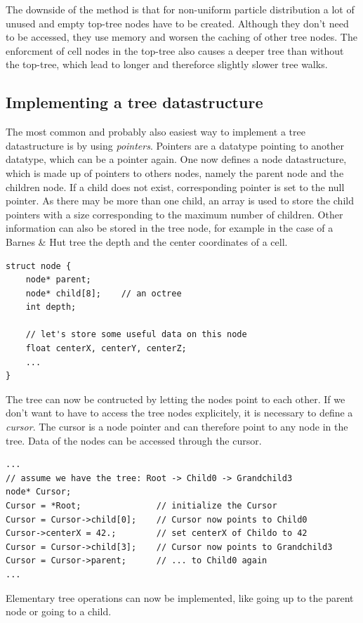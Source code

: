 The downside of the method is that for non-uniform particle distribution a lot of unused and empty top-tree nodes have to be created. Although they don't need to be accessed, they use memory and worsen the caching of other tree nodes. The enforcment of cell nodes in the top-tree also causes a deeper tree than without the top-tree, which lead to longer and thereforce slightly slower tree walks.\\

\subsection{Implementing a tree datastructure}
The most common and probably also easiest way to implement a tree datastructure is by using \emph{pointers}. Pointers are a datatype pointing to another datatype, which can be a pointer again. One now defines a node datastructure, which is made up of pointers to others nodes, namely the parent node and the children node. If a child does not exist, corresponding pointer is set to the null pointer. As there may be more than one child, an array is used to store the child pointers with a size corresponding to the maximum number of children. Other information can also be stored in the tree node, for example in the case of a Barnes \& Hut tree the depth and the center coordinates of a cell.
\begin{verbatim}
struct node {
    node* parent;
    node* child[8];    // an octree
    int depth;
    
    // let's store some useful data on this node
    float centerX, centerY, centerZ;
    ...
}
\end{verbatim}

The tree can now be contructed by letting the nodes point to each other. If we don't want to have to access the tree nodes explicitely, it is necessary to define a \emph{cursor}. The cursor is a node pointer and can therefore point to any node in the tree. Data of the nodes can be accessed through the cursor. 
\begin{verbatim}
...
// assume we have the tree: Root -> Child0 -> Grandchild3
node* Cursor;
Cursor = *Root;               // initialize the Cursor
Cursor = Cursor->child[0];    // Cursor now points to Child0
Cursor->centerX = 42.;        // set centerX of Childo to 42
Cursor = Cursor->child[3];    // Cursor now points to Grandchild3
Cursor = Cursor->parent;      // ... to Child0 again
...
\end{verbatim}

Elementary tree operations can now be implemented, like going up to the parent node or going to a child.\\

